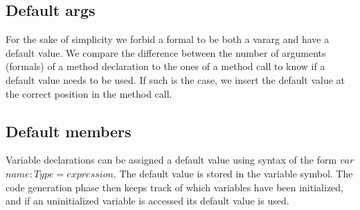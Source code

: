\subsection{Default args}
For the sake of simplicity we forbid a formal to be both a vararg and have a default value.
We compare the difference between the number of arguments (formals) of a method declaration to the ones of a method call to know if a default value needs to be used. If such is the case, we insert the default value at the correct position in the method call.

\subsection{Default members}
Variable declarations can be assigned a default value using syntax of the form $var$ $name: Type = expression$. The default value is stored in the variable symbol. The code generation phase then keeps track of which variables have been initialized, and if an uninitialized variable is accessed its default value is used.